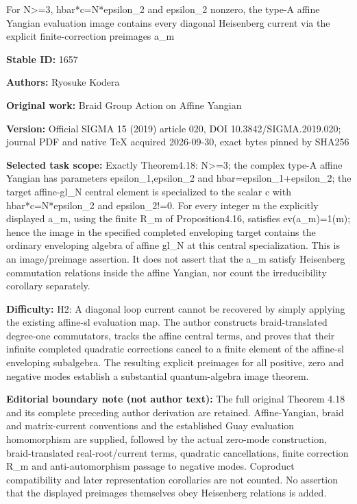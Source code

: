 \documentclass[11pt]{article}
\theoremstyle{definition}
\numberwithin{equation}{section}
\begin{document}
\begin{center}\Large For N>=3, hbar*c=N*epsilon\_2 and epsilon\_2 nonzero, the type-A affine Yangian evaluation image contains every diagonal Heisenberg current via the explicit finite-correction preimages a\_m\end{center}
\noindent\textbf{Stable ID:} 1657\par
\noindent\textbf{Authors:} Ryosuke Kodera\par
\noindent\textbf{Original work:} Braid Group Action on Affine Yangian\par
\noindent\textbf{Version:} Official SIGMA 15 (2019) article 020, DOI 10.3842/SIGMA.2019.020; journal PDF and native TeX acquired 2026-09-30, exact bytes pinned by SHA256\par
\noindent\textbf{Selected task scope:} Exactly Theorem4.18: N>=3; the complex type-A affine Yangian has parameters epsilon\_1,epsilon\_2 and hbar=epsilon\_1+epsilon\_2; the target affine-gl\_N central element is specialized to the scalar c with hbar*c=N*epsilon\_2 and epsilon\_2!=0. For every integer m the explicitly displayed a\_m, using the finite R\_m of Proposition4.16, satisfies ev(a\_m)=1(m); hence the image in the specified completed enveloping target contains the ordinary enveloping algebra of affine gl\_N at this central specialization. This is an image/preimage assertion. It does not assert that the a\_m satisfy Heisenberg commutation relations inside the affine Yangian, nor count the irreducibility corollary separately.\par
\noindent\textbf{Difficulty:} H2: A diagonal loop current cannot be recovered by simply applying the existing affine-sl evaluation map. The author constructs braid-translated degree-one commutators, tracks the affine central terms, and proves that their infinite completed quadratic corrections cancel to a finite element of the affine-sl enveloping subalgebra. The resulting explicit preimages for all positive, zero and negative modes establish a substantial quantum-algebra image theorem.\par
\noindent\textbf{Editorial boundary note (not author text):} The full original Theorem 4.18 and its complete preceding author derivation are retained. Affine-Yangian, braid and matrix-current conventions and the established Guay evaluation homomorphism are supplied, followed by the actual zero-mode construction, braid-translated real-root/current terms, quadratic cancellations, finite correction R\_m and anti-automorphism passage to negative modes. Coproduct compatibility and later representation corollaries are not counted. No assertion that the displayed preimages themselves obey Heisenberg relations is added.\par
\end{document}
